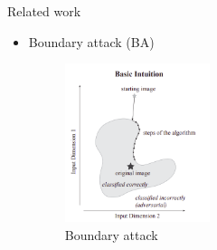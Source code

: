 \documentclass[11pt,t]{beamer}
\begin{document}
\begin{frame}{Related work}
\begin{itemize}
	\item Boundary attack (BA)
	\vspace{-32pt}
	\hspace{5pt}
	\begin{figure}
	\centering
	\hspace{5pt}
	\includegraphics[width=0.4\textwidth]{graphics/boundary_attack.png}
	\caption{Boundary attack \cite{brendel2018decisionbased}\label{fig:boundary_attack}}
	\footnotesize
	\flushleft
	\end{figure}
\end{itemize}

\end{frame}

%
\end{document}

